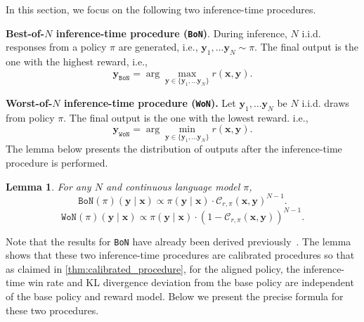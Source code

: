 \documentclass{article}
\newcommand{\by}{{\bm{y}}}
\newcommand{\bx}{{\bm{x}}}
\newcommand{\qt}{\mathcal{C}}
\newtheorem{lemma}{Lemma}
\newcommand{\bofn}{\texttt{BoN}\xspace}
\newcommand{\wofn}{\texttt{WoN}\xspace}
\newcommand{\iid}{i.i.d.\xspace}
\begin{document}
%
In this section, we focus on the following two inference-time procedures.
%

\noindent \textbf{Best-of-$N$ inference-time procedure (\bofn)}. During inference, $N$ \iid responses from a policy $\pi$ are generated, i.e., $\by_1, \ldots \by_N \sim \pi$. The final output is the one with the highest reward, i.e.,
    \[
        \by_{\bofn} = \arg \max_{\by \in  \{ \by_1, \ldots \by_N\}}
 r(\bx, \by)    .
 \]
 
\noindent \textbf{Worst-of-$N$ inference-time procedure (\wofn).}  Let $\by_1, \ldots \by_N$ be $N$ \iid draws from policy $\pi$. The final output is the one with the lowest reward. i.e.,
\[
    \by_{\wofn} = \arg \min_{\by \in  \{ \by_1, \ldots \by_N\}}
 r(\bx, \by)    .
\]
%
%
The lemma below presents the distribution of outputs after the inference-time procedure is performed.
%
\begin{lemma} \label{lem:bofn_wofn}
For any $N$ and continuous language model $\pi$,
\[
    \bofn(\pi)(\by \mid \bx) \propto \pi(\by \mid \bx) \cdot \qt_{r, \pi}(\bx, \by)^{N-1}.
\]
\[
    \wofn(\pi)(\by \mid \bx) \propto \pi(\by \mid \bx)   \cdot  (1 - \qt_{r, \pi}(\bx, \by))^{N-1}.
\]
\end{lemma}
Note that the results for \bofn have already been derived previously~\citep{beirami2024theoretical,gui2024bonbonalignmentlargelanguage,amini2024variationalbestofnalignment}.
The lemma shows that these two inference-time procedures are calibrated procedures so that as claimed in \cref{thm:calibrated_procedure}, for the aligned policy, the inference-time win rate and KL divergence deviation from the base policy are independent of the base policy and reward model. Below we present the precise formula for these two procedures.

%
\end{document}
